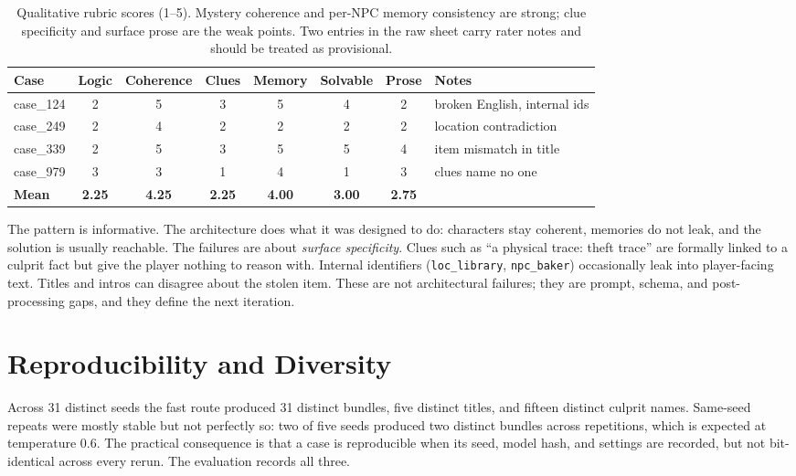 ﻿\documentclass[11pt,a4paper]{report}
\begin{document}
\begin{table}[htbp]
  \centering
  \footnotesize
  \setlength{\tabcolsep}{3.5pt}
  \begin{tabular}{@{}lccccccl@{}}
    \toprule
    \textbf{Case} & \textbf{Logic} & \textbf{Coherence} & \textbf{Clues} & \textbf{Memory} & \textbf{Solvable} & \textbf{Prose} & \textbf{Notes} \\
    \midrule
    case\_124 & 2 & 5 & 3 & 5 & 4 & 2 & broken English, internal ids \\
    case\_249 & 2 & 4 & 2 & 2 & 2 & 2 & location contradiction \\
    case\_339 & 2 & 5 & 3 & 5 & 5 & 4 & item mismatch in title \\
    case\_979 & 3 & 3 & 1 & 4 & 1 & 3 & clues name no one \\
    \midrule
    \textbf{Mean} & \textbf{2.25} & \textbf{4.25} & \textbf{2.25} & \textbf{4.00} & \textbf{3.00} & \textbf{2.75} & \\
    \bottomrule
  \end{tabular}
  \caption{Qualitative rubric scores (1--5). Mystery coherence and per-NPC memory consistency are strong; clue specificity and surface prose are the weak points. Two entries in the raw sheet carry rater notes and should be treated as provisional.}
  \label{tab:rubric}
\end{table}

The pattern is informative. The architecture does what it was designed to do: characters stay coherent, memories do not leak, and the solution is usually reachable. The failures are about \emph{surface specificity}. Clues such as ``a physical trace: theft trace'' are formally linked to a culprit fact but give the player nothing to reason with. Internal identifiers (\texttt{loc\_library}, \texttt{npc\_baker}) occasionally leak into player-facing text. Titles and intros can disagree about the stolen item. These are not architectural failures; they are prompt, schema, and post-processing gaps, and they define the next iteration.

\section{Reproducibility and Diversity}
Across 31 distinct seeds the fast route produced 31 distinct bundles, five distinct titles, and fifteen distinct culprit names. Same-seed repeats were mostly stable but not perfectly so: two of five seeds produced two distinct bundles across repetitions, which is expected at temperature 0.6. The practical consequence is that a case is reproducible when its seed, model hash, and settings are recorded, but not bit-identical across every rerun. The evaluation records all three.
\end{document}
